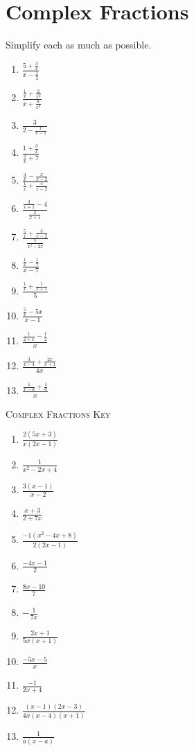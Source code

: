 \chapter{Complex Fractions}

Simplify each as much as possible.

\begin{multicols}{3}
\begin{enumerate}
\setlength\itemsep{10pt}
\item $\frac{5+\frac{3}{x}}{x-\frac{1}{2}}$
\item $\frac{\frac{1}{x}+\frac{2}{x^2}}{x+\frac{8}{x^2}}$
\item $\frac{3}{2-\frac{x}{x-1}}$
\item $\frac{1+\frac{3}{x}}{\frac{2}{x}+7}$
\item $\frac{\frac{4}{x}-\frac{x}{x-2}}{\frac{1}{x}+{\frac{3}{x-2}}}$
\item $\frac{\frac{3}{x+1}-4}{\frac{2}{x+1}}$
\item $\frac{\frac{5}{x}+\frac{3}{x-2}}{\frac{7}{x^2-2x}}$
\item $\frac{\frac{1}{x}-\frac{1}{7}}{x-7}$
\item $\frac{\frac{1}{x}+\frac{1}{x+1}}{5}$
\item $\frac{\frac{5}{x}-5x}{x-1}$
\item $\frac{\frac{1}{2+x}-\frac{1}{2}}{x}$
\item $\frac{\frac{3}{x-4}+\frac{2x}{x+1}}{4x}$
\item $\frac{\frac{1}{x-a}+\frac{1}{a}}{x}$
\end{enumerate}
\end{multicols}

\newpage

\textsc{Complex Fractions Key}

\begin{multicols}{3}
\begin{enumerate}
\setlength\itemsep{10pt}
\item $\frac{2(5x+3)}{x(2x-1)}$
\item $\frac{1}{x^2-2x+4}$
\item $\frac{3(x-1)}{x-2}$
\item $\frac{x+3}{2+7x}$
\item $\frac{-1(x^2-4x+8)}{2(2x-1)}$
\item $\frac{-4x-1}{2}$
\item $\frac{8x-10}{7}$
\item $-\frac{1}{7x}$
\item $\frac{2x+1}{5x(x+1)}$
\item $\frac{-5x-5}{x}$
\item $\frac{-1}{2x+4}$
\item $\frac{(x-1)(2x-3)}{4x(x-4)(x+1)}$
\item $\frac{1}{a(x-a)}$
\end{enumerate}
\end{multicols}